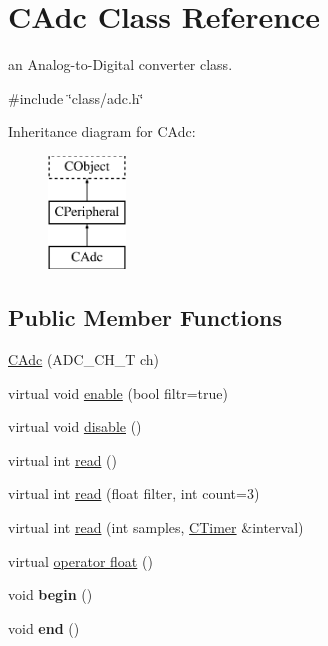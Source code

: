 \hypertarget{class_c_adc}{\section{C\-Adc Class Reference}
\label{class_c_adc}
}


an Analog-\/to-\/\-Digital converter class.  




{\ttfamily \#include \char`\"{}class/adc.\-h\char`\"{}}

Inheritance diagram for C\-Adc\-:\begin{figure}[H]
\begin{center}
\leavevmode
\includegraphics[height=3.000000cm]{class_c_adc}
\end{center}
\end{figure}
\subsection*{Public Member Functions}
\begin{DoxyCompactItemize}
\item 
\hyperlink{class_c_adc_a3d122c0e7fe686958371eabc9ed0db3f}{C\-Adc} (A\-D\-C\-\_\-\-C\-H\-\_\-\-T ch)
\item 
virtual void \hyperlink{class_c_adc_a11f59e83f9a3815e7980273a0b9bdd5b}{enable} (bool filtr=true)
\item 
virtual void \hyperlink{class_c_adc_ad3fc0560a6fbbca6d1cae12b187f98b7}{disable} ()
\item 
virtual int \hyperlink{class_c_adc_aa0748ed4e15aded89101060e388af8be}{read} ()
\item 
virtual int \hyperlink{class_c_adc_a20a6e83792c914309d2b0845e798b4d7}{read} (float filter, int count=3)
\item 
virtual int \hyperlink{class_c_adc_a31643f0558a614c013d476818156a1a1}{read} (int samples, \hyperlink{class_c_timer}{C\-Timer} \&interval)
\item 
virtual \hyperlink{class_c_adc_a678a8b70b4d4a2537c99eaba562e75b8}{operator float} ()
\item 
\hypertarget{class_c_adc_ad27b537dba363079fc68ee48050183d6}{void {\bfseries begin} ()}\label{class_c_adc_ad27b537dba363079fc68ee48050183d6}

\item 
\hypertarget{class_c_adc_a83103970c96cf7f0638bc44a11fa68b6}{void {\bfseries end} ()}\label{class_c_adc_a83103970c96cf7f0638bc44a11fa68b6}

\end{DoxyCompactItemize}


